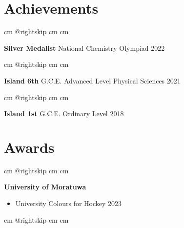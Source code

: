 \documentclass[10pt, a4paper]{article}
\newenvironment{highlights}{
        \begin{itemize}[
                topsep=0pt,
                parsep=0.10 cm,
                partopsep=0pt,
                itemsep=0pt,
                after=\vspace{-1\baselineskip},
                leftmargin=0.4 cm + 3pt
            ]
    }{
        \end{itemize}
    } %
\begin{document}
    \section{Achievements}

        \begingroup{} cm
        \advance\csname @rightskip cm
        \advance{} cm

        \textbf{Silver Medalist} National Chemistry Olympiad 2022 \par\endgroup

        \vspace{0.2 cm}
        \begingroup{} cm
        \advance\csname @rightskip cm
        \advance{} cm

        \textbf{Island 6th} G.C.E. Advanced Level Physical Sciences 2021 \par\endgroup
        
         \vspace{0.2 cm}
        \begingroup{} cm
        \advance\csname @rightskip cm
        \advance{} cm

        \textbf{Island 1st} G.C.E. Ordinary Level 2018 \par\endgroup

    \section{Awards}

        \begingroup{} cm
        \advance\csname @rightskip cm
        \advance{} cm

        \textbf{University of Moratuwa}  \begin{highlights}
		\item University Colours for Hockey 2023
	\end{highlights}
        \par\endgroup

        \vspace{0.6 cm}
        \begingroup{} cm
        \advance\csname @rightskip cm
        \advance{} cm
\end{document}
